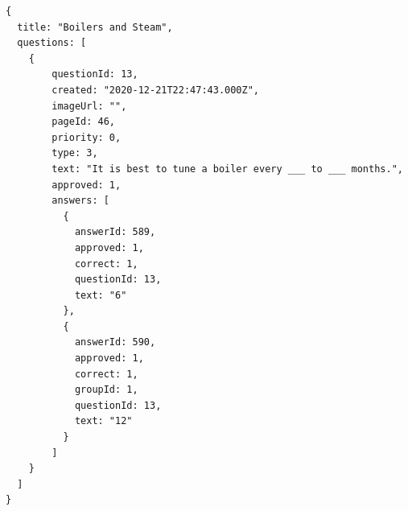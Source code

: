 \documentclass[onecolumn, draftclsnofoot,10pt, compsoc, usenames, dvipsnames]{IEEEtran}
\begin{document}
\begin{lstlisting}[caption=Example Response]
{ 
  title: "Boilers and Steam",
  questions: [
    {
        questionId: 13,
        created: "2020-12-21T22:47:43.000Z",
        imageUrl: "",
        pageId: 46,
        priority: 0,
        type: 3,
        text: "It is best to tune a boiler every ___ to ___ months.",
        approved: 1,
        answers: [
          {
            answerId: 589,
            approved: 1,
            correct: 1,
            questionId: 13,
            text: "6"
          },
          {
            answerId: 590,
            approved: 1,
            correct: 1,
            groupId: 1,
            questionId: 13,
            text: "12"
          }
        ]
    }
  ]
}
\end{lstlisting}
\\~\\
\end{document}

